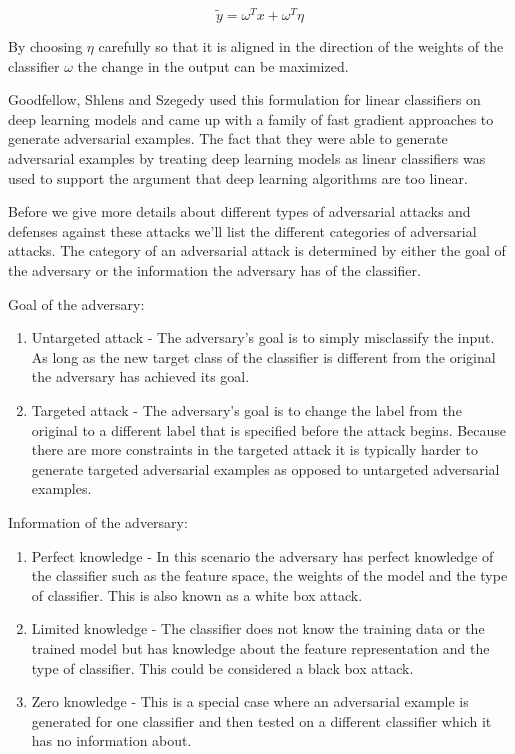 \documentclass[journal,onecolumn]{IEEEtran}
\begin{document}
\begin{equation}
\tilde{y} = \omega^{T}x + \omega^{T}\eta
\end{equation}

By choosing $\eta$ carefully so that it is aligned in the direction of the weights of the classifier $\omega$ the change in the output can be maximized. 

Goodfellow, Shlens and Szegedy \cite{goodfellow_explaining_2014} used this formulation for linear classifiers on deep learning models and came up with a family of fast gradient approaches to generate adversarial examples. The fact that they were able to generate adversarial examples by treating deep learning models as linear classifiers was used to support the argument that deep learning algorithms are too linear.

Before we give more details about different types of adversarial attacks and defenses against these attacks we'll list the different categories of adversarial attacks. The category of an adversarial attack is determined by either the goal of the adversary or the information the adversary has of the classifier.

Goal of the adversary:
\begin{enumerate}
\item Untargeted attack - The adversary's goal is to simply misclassify the input. As long as the new target class of the classifier is different from the original the adversary has achieved its goal.
\item Targeted attack - The adversary's goal is to change the label from the original to a different label that is specified before the attack begins. Because there are more constraints in the targeted attack it is typically harder to generate targeted adversarial examples as opposed to untargeted adversarial examples.
\end{enumerate}

Information of the adversary:
\begin{enumerate}
\item Perfect knowledge - In this scenario the adversary has perfect knowledge of the classifier such as the feature space, the weights of the model and the type of classifier. This is also known as a white box attack.
\item Limited knowledge - The classifier does not know the training data or the trained model but has knowledge about the feature representation and the type of classifier. This could be considered a black box attack.
\item Zero knowledge - This is a special case where an adversarial example is generated for one classifier and then tested on a different classifier which it has no information about.
\end{enumerate}
\end{document}
